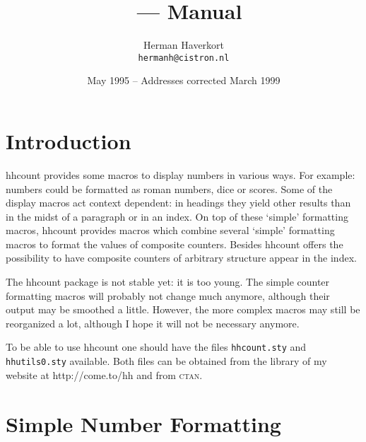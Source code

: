 \documentclass[11pt]{article}
\title{\hhcount\ --- Manual}
\author{Herman Haverkort\\\normalsize\normalfont\texttt{hermanh@cistron.nl}}
\date{May 1995 -- Addresses corrected March 1999}
\def\packagename#1{{\sffamily #1}}     %
\def\hhcount{\packagename{hhcount}\xspace}
\begin{document}
\maketitle

\section{Introduction}

\hhcount provides some macros to display numbers in various ways.
For example: numbers could be formatted as roman numbers, dice or
scores. Some of the display macros act context dependent: in headings
they yield other results than in the midst of a paragraph or in an
index. On top of these `simple' formatting macros, \hhcount
provides macros which combine several `simple' formatting macros
to format the values of composite counters. Besides \hhcount
offers the possibility to have composite counters of arbitrary
structure appear in the index.

The \hhcount package is not stable yet: it is too young. The simple
counter formatting macros will probably not change much anymore,
although their output may be smoothed a little. However,
the more complex macros may still be reorganized a lot, although
I hope it will not be necessary anymore.

To be able to use \hhcount one should have the files
\texttt{hhcount.sty} and \texttt{hhutils0.sty} available.
Both files can be obtained from the library of my website at
http://come.to/hh and from \textsc{ctan}.

\section{Simple Number Formatting}\label{sec:snf}
\end{document}
